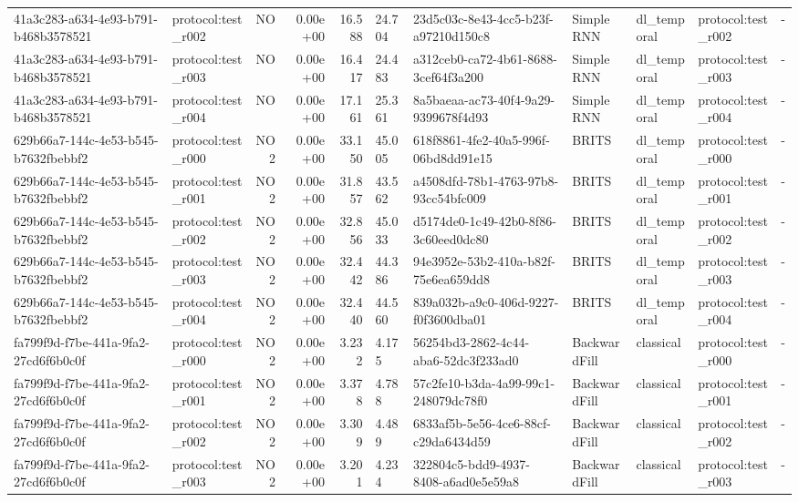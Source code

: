 \begin{table}[htbp]
\begin{tabular}{llrrr}
41a3c283-a634-4e93-b791-b468b3578521 & protocol:test\_r002 & NO & 0.00e+00 & 16.588 & 24.704 & 23d5c03c-8e43-4cc5-b23f-a97210d150c8 & Simple RNN & dl\_temporal & protocol:test\_r002 & - \\
41a3c283-a634-4e93-b791-b468b3578521 & protocol:test\_r003 & NO & 0.00e+00 & 16.417 & 24.483 & a312ceb0-ca72-4b61-8688-3cef64f3a200 & Simple RNN & dl\_temporal & protocol:test\_r003 & - \\
41a3c283-a634-4e93-b791-b468b3578521 & protocol:test\_r004 & NO & 0.00e+00 & 17.161 & 25.361 & 8a5baeaa-ac73-40f4-9a29-9399678f4d93 & Simple RNN & dl\_temporal & protocol:test\_r004 & - \\
629b66a7-144c-4e53-b545-b7632fbebbf2 & protocol:test\_r000 & NO2 & 0.00e+00 & 33.150 & 45.005 & 618f8861-4fe2-40a5-996f-06bd8dd91e15 & BRITS & dl\_temporal & protocol:test\_r000 & - \\
629b66a7-144c-4e53-b545-b7632fbebbf2 & protocol:test\_r001 & NO2 & 0.00e+00 & 31.857 & 43.562 & a4508dfd-78b1-4763-97b8-93cc54bfc009 & BRITS & dl\_temporal & protocol:test\_r001 & - \\
629b66a7-144c-4e53-b545-b7632fbebbf2 & protocol:test\_r002 & NO2 & 0.00e+00 & 32.856 & 45.033 & d5174de0-1c49-42b0-8f86-3c60eed0dc80 & BRITS & dl\_temporal & protocol:test\_r002 & - \\
629b66a7-144c-4e53-b545-b7632fbebbf2 & protocol:test\_r003 & NO2 & 0.00e+00 & 32.442 & 44.386 & 94e3952e-53b2-410a-b82f-75e6ea659dd8 & BRITS & dl\_temporal & protocol:test\_r003 & - \\
629b66a7-144c-4e53-b545-b7632fbebbf2 & protocol:test\_r004 & NO2 & 0.00e+00 & 32.440 & 44.560 & 839a032b-a9c0-406d-9227-f0f3600dba01 & BRITS & dl\_temporal & protocol:test\_r004 & - \\
fa799f9d-f7be-441a-9fa2-27cd6f6b0c0f & protocol:test\_r000 & NO2 & 0.00e+00 & 3.232 & 4.175 & 56254bd3-2862-4c44-aba6-52dc3f233ad0 & BackwardFill & classical & protocol:test\_r000 & - \\
fa799f9d-f7be-441a-9fa2-27cd6f6b0c0f & protocol:test\_r001 & NO2 & 0.00e+00 & 3.378 & 4.788 & 57c2fe10-b3da-4a99-99c1-248079dc78f0 & BackwardFill & classical & protocol:test\_r001 & - \\
fa799f9d-f7be-441a-9fa2-27cd6f6b0c0f & protocol:test\_r002 & NO2 & 0.00e+00 & 3.309 & 4.489 & 6833af5b-5e56-4ce6-88cf-c29da6434d59 & BackwardFill & classical & protocol:test\_r002 & - \\
fa799f9d-f7be-441a-9fa2-27cd6f6b0c0f & protocol:test\_r003 & NO2 & 0.00e+00 & 3.201 & 4.234 & 322804c5-bdd9-4937-8408-a6ad0e5e59a8 & BackwardFill & classical & protocol:test\_r003 & - \\

\end{tabular}
\end{table}
